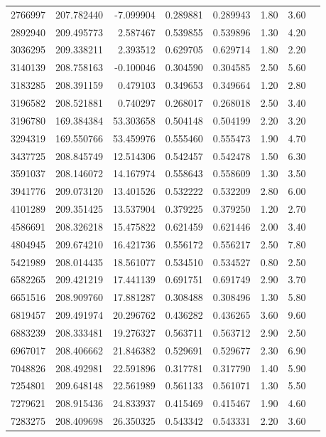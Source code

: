 \begin{longtable}{lrrrrrrr}
2766997 & 207.782440 & -7.099904 & 0.289881 & 0.289943 & 1.80 & 3.60 \\
2892940 & 209.495773 & 2.587467 & 0.539855 & 0.539896 & 1.30 & 4.20 \\
3036295 & 209.338211 & 2.393512 & 0.629705 & 0.629714 & 1.80 & 2.20 \\
3140139 & 208.758163 & -0.100046 & 0.304590 & 0.304585 & 2.50 & 5.60 \\
3183285 & 208.391159 & 0.479103 & 0.349653 & 0.349664 & 1.20 & 2.80 \\
3196582 & 208.521881 & 0.740297 & 0.268017 & 0.268018 & 2.50 & 3.40 \\
3196780 & 169.384384 & 53.303658 & 0.504148 & 0.504199 & 2.20 & 3.20 \\
3294319 & 169.550766 & 53.459976 & 0.555460 & 0.555473 & 1.90 & 4.70 \\
3437725 & 208.845749 & 12.514306 & 0.542457 & 0.542478 & 1.50 & 6.30 \\
3591037 & 208.146072 & 14.167974 & 0.558643 & 0.558609 & 1.30 & 3.50 \\
3941776 & 209.073120 & 13.401526 & 0.532222 & 0.532209 & 2.80 & 6.00 \\
4101289 & 209.351425 & 13.537904 & 0.379225 & 0.379250 & 1.20 & 2.70 \\
4586691 & 208.326218 & 15.475822 & 0.621459 & 0.621446 & 2.00 & 3.40 \\
4804945 & 209.674210 & 16.421736 & 0.556172 & 0.556217 & 2.50 & 7.80 \\
5421989 & 208.014435 & 18.561077 & 0.534510 & 0.534527 & 0.80 & 2.50 \\
6582265 & 209.421219 & 17.441139 & 0.691751 & 0.691749 & 2.90 & 3.70 \\
6651516 & 208.909760 & 17.881287 & 0.308488 & 0.308496 & 1.30 & 5.80 \\
6819457 & 209.491974 & 20.296762 & 0.436282 & 0.436265 & 3.60 & 9.60 \\
6883239 & 208.333481 & 19.276327 & 0.563711 & 0.563712 & 2.90 & 2.50 \\
6967017 & 208.406662 & 21.846382 & 0.529691 & 0.529677 & 2.30 & 6.90 \\
7048826 & 208.492981 & 22.591896 & 0.317781 & 0.317790 & 1.40 & 5.90 \\
7254801 & 209.648148 & 22.561989 & 0.561133 & 0.561071 & 1.30 & 5.50 \\
7279621 & 208.915436 & 24.833937 & 0.415469 & 0.415467 & 1.90 & 4.60 \\
7283275 & 208.409698 & 26.350325 & 0.543342 & 0.543331 & 2.20 & 3.60 \\

\end{longtable}
